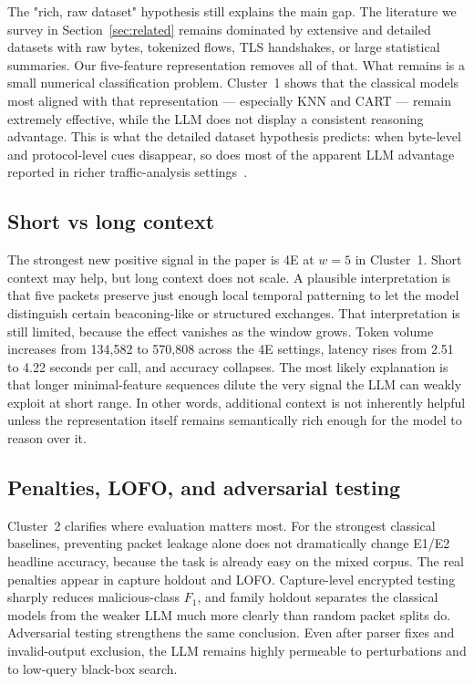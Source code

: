 \documentclass[conference]{IEEEtran}
\begin{document}
The "rich, raw dataset" hypothesis still explains the main gap. The literature we survey in Section~\ref{sec:related} remains dominated by extensive and detailed datasets with raw bytes, tokenized flows, TLS handshakes, or large statistical summaries. Our five-feature representation removes all of that. What remains is a small numerical classification problem. Cluster~1 shows that the classical models most aligned with that representation --- especially KNN and CART --- remain extremely effective, while the LLM does not display a consistent reasoning advantage. This is what the detailed dataset hypothesis predicts: when byte-level and protocol-level cues disappear, so does most of the apparent LLM advantage reported in richer traffic-analysis settings~\cite{lin2022etbert,cui2025trafficllm,jia2025mentor,ginige2024trafficgpt}.

\subsection{Short vs long context}

The strongest new positive signal in the paper is 4E at $w=5$ in Cluster~1. Short context may help, but long context does not scale. A plausible interpretation is that five packets preserve just enough local temporal patterning to let the model distinguish certain beaconing-like or structured exchanges. That interpretation is still limited, because the effect vanishes as the window grows. Token volume increases from 134{,}582 to 570{,}808 across the 4E settings, latency rises from 2.51 to 4.22 seconds per call, and accuracy collapses. The most likely explanation is that longer minimal-feature sequences dilute the very signal the LLM can weakly exploit at short range. In other words, additional context is not inherently helpful unless the representation itself remains semantically rich enough for the model to reason over it.

\subsection{Penalties, LOFO, and adversarial testing}

Cluster~2 clarifies where evaluation matters most. For the strongest classical baselines, preventing packet leakage alone does not dramatically change E1/E2 headline accuracy, because the task is already easy on the mixed corpus. The real penalties appear in capture holdout and LOFO. Capture-level encrypted testing sharply reduces malicious-class $F_1$, and family holdout separates the classical models from the weaker LLM much more clearly than random packet splits do. Adversarial testing strengthens the same conclusion. Even after parser fixes and invalid-output exclusion, the LLM remains highly permeable to perturbations and to low-query black-box search.
\end{document}
